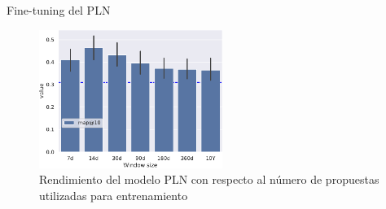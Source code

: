 \begin{frame}{Fine-tuning del PLN}
    \begin{figure}
        \centering
        \includegraphics[height=45mm]{./images/graphs/11_cosine_results_window-size_W-THU_normalize=True_beamer.pdf}
        \caption{Rendimiento del modelo PLN con respecto al número de propuestas utilizadas para entrenamiento}
    \end{figure}
\end{frame}

